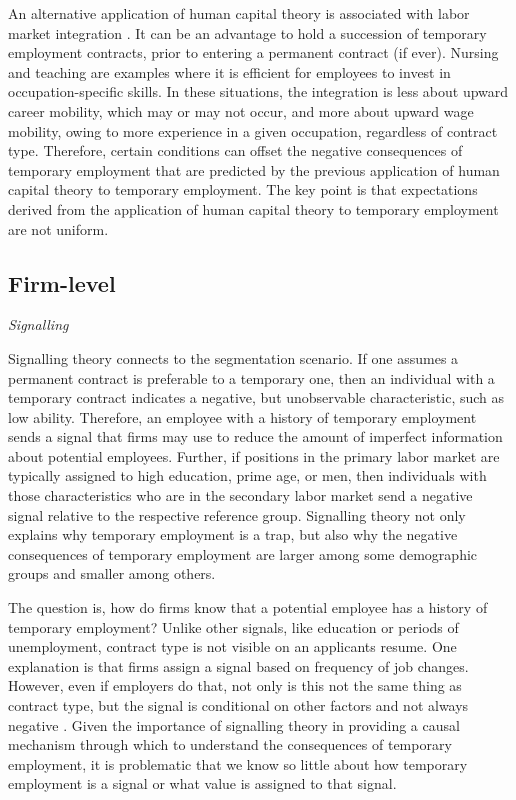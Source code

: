 \documentclass[12pt]{article}
\begin{document}
An alternative application of human capital theory is associated with labor market integration \citep{booth_etal_2002}.  It can be an advantage to hold a succession of temporary employment contracts, prior to entering a permanent contract (if ever).  Nursing and teaching are examples where it is efficient for employees to invest in occupation-specific skills.  In these situations, the integration is less about upward career mobility, which may or may not occur, and more about upward wage mobility, owing to more experience in a given occupation, regardless of contract type.  Therefore, certain conditions can offset the negative consequences of temporary employment that are predicted by the previous application of human capital theory to temporary employment.  The key point is that expectations derived from the application of human capital theory to temporary employment are not uniform.

\subsection{Firm-level}

\emph{Signalling}

Signalling theory \citep{spence_1973} connects to the segmentation scenario.  If one assumes a permanent contract is preferable to a temporary one, then an individual with a temporary contract indicates a negative, but unobservable characteristic, such as low ability.  Therefore, an employee with a history of temporary employment sends a signal that firms may use to reduce the amount of imperfect information about potential employees.  Further, if positions in the primary labor market are typically assigned to high education, prime age, or men, then individuals with those characteristics who are in the secondary labor market send a negative signal relative to the respective reference group.  Signalling theory not only explains why temporary employment is a trap, but also why the negative consequences of temporary employment are larger among some demographic groups and smaller among others.  

The question is, how do firms know that a potential employee has a history of temporary employment?  Unlike other signals, like education or periods of unemployment, contract type is not visible on an applicants resume.  One explanation is that firms assign a signal based on frequency of job changes.  However, even if employers do that, not only is this not the same thing as contract type, but the signal is conditional on other factors and not always negative \citep{moss_tilly_2001,pedulla_2020}.  Given the importance of signalling theory in providing a causal mechanism through which to understand the consequences of temporary employment, it is problematic that we know so little about how temporary employment is a signal or what value is assigned to that signal.
\end{document}
